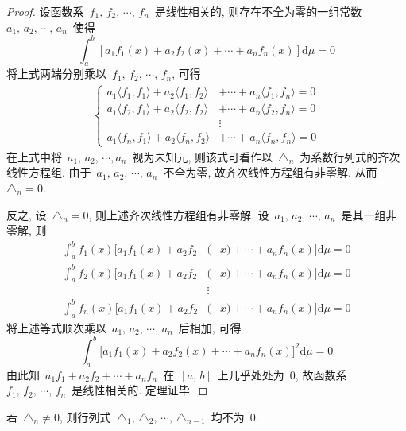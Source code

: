 \begin{proof}
设函数系~$f_{1},\, f_{2},\, \cdots,\,  f_{n}$~是线性相关的, 则存在不全为零的一组常数
~$a_{1},\, a_{2},\, \cdots,\, a_{n}$~使得
\[
\int_{a}^{b}\left[a_{1}f_{1}(x)+a_{2}f_{2}(x)+\cdots+a_{n}f_{n}(x)\right]\mathrm{d}\mu=0
\]
将上式两端分别乘以~$f_{1},\, f_{2},\, \cdots,\,  f_{n}$, 可得
\begin{eqnarray}
\left\{
\begin{aligned}
a_{1}\langle f_{1},f_{1}\rangle+a_{2}\langle f_{1},f_{2}\rangle&+\cdots+a_{n}\langle f_{1},f_{n}\rangle=0\\
a_{1}\langle f_{2},f_{1}\rangle+a_{2}\langle f_{2},f_{2}\rangle&+\cdots+a_{n}\langle f_{2},f_{n}\rangle=0\\
&\vdots                   \\[0.2cm]
a_{1}\langle f_{n},f_{1}\rangle+a_{2}\langle f_{n},f_{2}\rangle&+\cdots+a_{n}\langle f_{n},f_{n}\rangle=0
\end{aligned}
\right.
\end{eqnarray}
在上式中将~$a_{1},\, a_{2},\, \cdots, a_{n}$~视为未知元, 则该式可看作以~$\triangle_{n}$~为系数行列式的齐次线性方程组. 由于~$a_{1},\, a_{2},\, \cdots,\, a_{n}$~不全为零, 故齐次线性方程组有非零解. 从而~$\triangle_{n}=0$.

反之, 设~$\triangle_{n}=0$, 则上述齐次线性方程组有非零解. 设~$a_{1},\, a_{2},\, \cdots,\, a_{n}$~是其一组非零解, 则
\begin{eqnarray*}
\int_{a}^{b}f_{1}(x)\big[a_{1}f_{1}(x)+a_{2}f_{2}\!\!\!\!\!&(&\!\!\!\!\!x)+\cdots+a_{n}f_{n}(x)\big]\mathrm{d}\mu=0\\
\int_{a}^{b}f_{2}(x)\big[a_{1}f_{1}(x)+a_{2}f_{2}\!\!\!\!\!&(&\!\!\!\!\!x)+\cdots+a_{n}f_{n}(x)\big]\mathrm{d}\mu=0\\
\!\!\!\!\!&\vdots&\!\!\!\!\!\\[0.2cm]
\int_{a}^{b}f_{n}(x)\big[a_{1}f_{1}(x)+a_{2}f_{2}\!\!\!\!\!&(&\!\!\!\!\!x)+\cdots+a_{n}f_{n}(x)\big]\mathrm{d}\mu=0
\end{eqnarray*}
将上述等式顺次乘以~$a_{1},\, a_{2},\,\cdots,\, a_{n}$~后相加, 可得
\[
\int_{a}^{b}\big[a_{1}f_{1}(x)+a_{2}f_{2}(x)+\cdots+a_{n}f_{n}(x)\big]^{2}\mathrm{d}\mu=0
\]
由此知~$a_{1}f_{1}+a_{2}f_{2}+\cdots+a_{n}f_{n}$~在~$[a,\,b]$~上几乎处处为~0, 故函数系~$f_{1},\, f_{2},\, \cdots,\, f_{n}$~是线性相关的. 定理证毕.
\end{proof}

\begin{Corollary}
若~$\triangle_{n}\neq 0$, 则行列式~$\triangle_{1},\, \triangle_{2},\, \cdots,\, \triangle_{n-1}$~均不为~0.
\end{Corollary}

